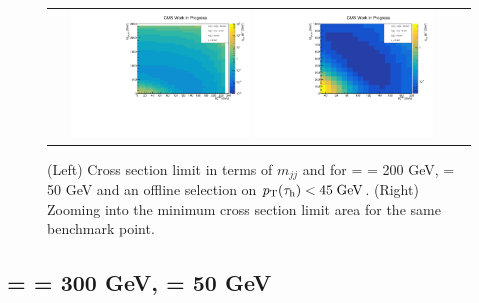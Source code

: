 \begin{figure}[tbh!]
	\centering
	\begin{tabular}{cc}
		\includegraphics[width=0.45\textwidth]{analysis/pics/JetInvMass_vs_MET_xsec_chi200_lsp050_taupt45.pdf}
		\includegraphics[width=0.45\textwidth]{analysis/pics/JetInvMass_vs_MET_xsec_chi200_lsp050_taupt45_zoom.pdf} 		
	\end{tabular}
	\caption{(Left) Cross section limit in terms of $m_{jj}$ and \met for \charginopm = \neutralinotwo = 200 GeV, \neutralinoone = 50 GeV and an offline selection on $p_{\text{T}}(\tau_{\text{h}}) <  45\;\text{Ge}\kern-0.06667em\text{V}$. (Right) Zooming into the minimum cross section limit area for the same benchmark point.}
	\label{fig::JetInvMass_vs_MET_xsec_chi200_lsp050_taupt45}
\end{figure}

\subsection*{\charginopm = \neutralinotwo = 300 GeV, \neutralinoone = 50 GeV}

